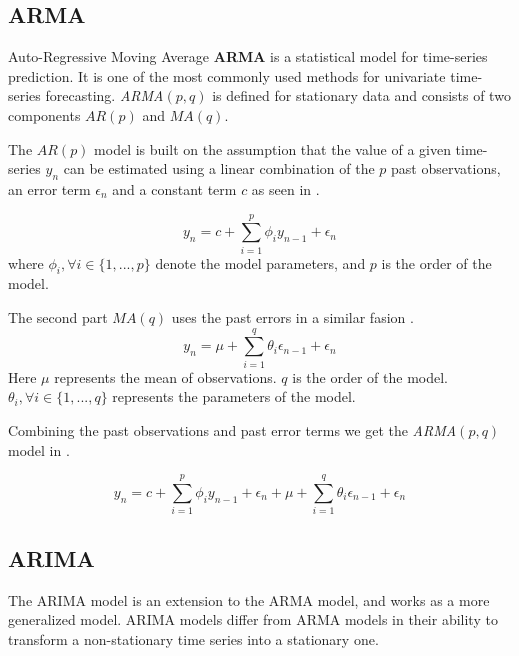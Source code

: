 
\subsection{ARMA}

Auto-Regressive Moving Average \textbf{ARMA} is a statistical model for time-series prediction.
It is one of the most commonly used methods for univariate time-series forecasting.
\textit{ARMA}$(p, q)$ is defined for stationary data and consists of two components $AR(p)$ and $MA(q)$.

The $AR(p)$ model is built on the assumption that the value of a given time-series $y_n$ can be estimated using a linear combination
of the $p$ past observations, an error term $\epsilon_n$ and a constant term $c$ as seen in  \citep{Box2016}.

\begin{equation}
  \label{eq:arma_ar(p)}
  y_n = c + \sum_{i=1}^{p} \phi_i y_{n-1} + \epsilon_n
\end{equation}
where $\phi_i, \forall i \in \{1, ..., p\} $ denote the model parameters, and $p$ is the order of the model.

The second part $MA(q)$ uses the past errors in a similar fasion .
\begin{equation}
  \label{eq_arma_ma(q)}
  y_n = \mu + \sum_{i=1}^{q} \theta_i \epsilon_{n-1} + \epsilon_n
\end{equation}
Here $\mu$ represents the mean of observations. $q$ is the order of the model. $\theta_i, \forall i \in \{1, ..., q\}$ represents the parameters of the model.

Combining the past observations  and past error terms  we get the \textit{ARMA}$(p,q)$ model in .

\begin{equation}
  \label{eq:arma}
  y_n = c + \sum_{i=1}^{p} \phi_i y_{n-1} + \epsilon_n + \mu + \sum_{i=1}^{q} \theta_i \epsilon_{n-1} + \epsilon_n
\end{equation}


\subsection{ARIMA}
The ARIMA model is an extension to the ARMA model, and works as a more generalized model.
ARIMA models differ from ARMA models in their ability to transform a non-stationary time series into a stationary one.

